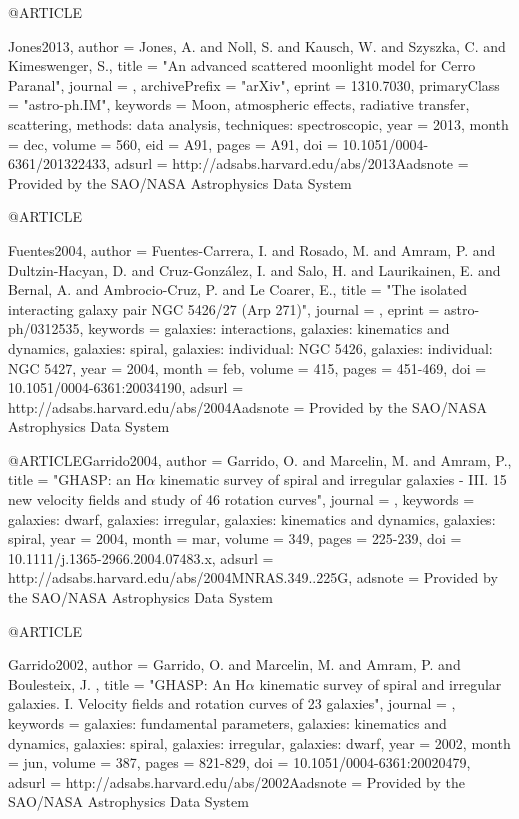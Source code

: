 \documentclass{aa}
\begin{document}
{{{{@ARTICLE{Jones2013,
   author = {{Jones}, A. and {Noll}, S. and {Kausch}, W. and {Szyszka}, C. and 
	{Kimeswenger}, S.},
    title = "{An advanced scattered moonlight model for Cerro Paranal}",
  journal = {\aap},
archivePrefix = "arXiv",
   eprint = {1310.7030},
 primaryClass = "astro-ph.IM",
 keywords = {Moon, atmospheric effects, radiative transfer, scattering, methods: data analysis, techniques: spectroscopic},
     year = 2013,
    month = dec,
   volume = 560,
      eid = {A91},
    pages = {A91},
      doi = {10.1051/0004-6361/201322433},
   adsurl = {http://adsabs.harvard.edu/abs/2013Aadsnote = {Provided by the SAO/NASA Astrophysics Data System}
}

@ARTICLE{Fuentes2004,
   author = {{Fuentes-Carrera}, I. and {Rosado}, M. and {Amram}, P. and {Dultzin-Hacyan}, D. and 
	{Cruz-Gonz{\'a}lez}, I. and {Salo}, H. and {Laurikainen}, E. and 
	{Bernal}, A. and {Ambrocio-Cruz}, P. and {Le Coarer}, E.},
    title = "{The isolated interacting galaxy pair NGC 5426/27 (Arp 271)}",
  journal = {\aap},
   eprint = {astro-ph/0312535},
 keywords = {galaxies: interactions, galaxies: kinematics and dynamics, galaxies: spiral, galaxies: individual: NGC 5426, galaxies: individual: NGC 5427},
     year = 2004,
    month = feb,
   volume = 415,
    pages = {451-469},
      doi = {10.1051/0004-6361:20034190},
   adsurl = {http://adsabs.harvard.edu/abs/2004Aadsnote = {Provided by the SAO/NASA Astrophysics Data System}
}

@ARTICLE{Garrido2004,
   author = {{Garrido}, O. and {Marcelin}, M. and {Amram}, P.},
    title = "{GHASP: an H{$\alpha$} kinematic survey of spiral and irregular galaxies - III. 15 new velocity fields and study of 46 rotation curves}",
  journal = {\mnras},
 keywords = {galaxies: dwarf, galaxies: irregular, galaxies: kinematics and dynamics, galaxies: spiral},
     year = 2004,
    month = mar,
   volume = 349,
    pages = {225-239},
      doi = {10.1111/j.1365-2966.2004.07483.x},
   adsurl = {http://adsabs.harvard.edu/abs/2004MNRAS.349..225G},
  adsnote = {Provided by the SAO/NASA Astrophysics Data System}
}

@ARTICLE{Garrido2002,
   author = {{Garrido}, O. and {Marcelin}, M. and {Amram}, P. and {Boulesteix}, J.
	},
    title = "{GHASP: An H{$\alpha$} kinematic survey of spiral and irregular galaxies. I. Velocity fields and rotation curves of 23 galaxies}",
  journal = {\aap},
 keywords = {galaxies: fundamental parameters, galaxies: kinematics and dynamics, galaxies: spiral, galaxies: irregular, galaxies: dwarf},
     year = 2002,
    month = jun,
   volume = 387,
    pages = {821-829},
      doi = {10.1051/0004-6361:20020479},
   adsurl = {http://adsabs.harvard.edu/abs/2002Aadsnote = {Provided by the SAO/NASA Astrophysics Data System}
}

}}}}}}}
\end{document}
